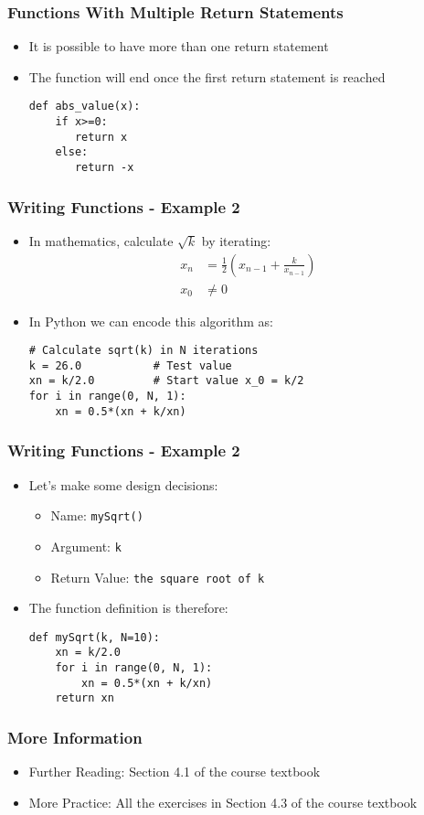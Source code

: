 \documentclass[english,14pt]{beamer}
\begin{document}
\begin{frame}[fragile]
\frametitle{Functions With Multiple Return Statements}
\begin{itemize}
\item It is possible to have more than one return statement
\item The function will end once the first return statement is reached
\begin{lstlisting}[style=CStyle]
def abs_value(x):
    if x>=0:
       return x
    else:
       return -x
\end{lstlisting}
\end{itemize}
\end{frame}

\begin{frame}[fragile]
\frametitle{Writing Functions - Example 2}
    \begin{itemize}
        \item In mathematics, calculate $\sqrt{k}$ by iterating:
            \begin{align*}
x_n &= \frac{1}{2}\left(x_{n-1} + \frac{k}{x_{n-1}}\right)\\
x_0 &\neq 0
            \end{align*}
        \item In Python we can encode this algorithm as:  
\begin{lstlisting}[style=CStyle]
# Calculate sqrt(k) in N iterations
k = 26.0           # Test value
xn = k/2.0         # Start value x_0 = k/2
for i in range(0, N, 1):
	xn = 0.5*(xn + k/xn)
\end{lstlisting}
    \end{itemize}
\end{frame}

\begin{frame}[fragile]
\frametitle{Writing Functions - Example 2}
\begin{itemize}
\item Let's make some design decisions:
	\begin{itemize}
		\item Name: \texttt{mySqrt()}
		\item Argument: \texttt{k}
		\item Return Value: \texttt{the square root of k}
	\end{itemize}
\item The function definition is therefore:
\begin{lstlisting}[style=CStyle]
def mySqrt(k, N=10):
    xn = k/2.0      
    for i in range(0, N, 1):
	    xn = 0.5*(xn + k/xn)
    return xn
\end{lstlisting}
\end{itemize}
\end{frame}

\begin{frame}
\frametitle{More Information}
\begin{center}
	\begin{itemize}
		\item Further Reading: Section 4.1 of the course textbook
        \item More Practice: All the exercises in Section 4.3 of the course textbook  
    \end{itemize}
\end{center}
\end{frame}
\end{document}
